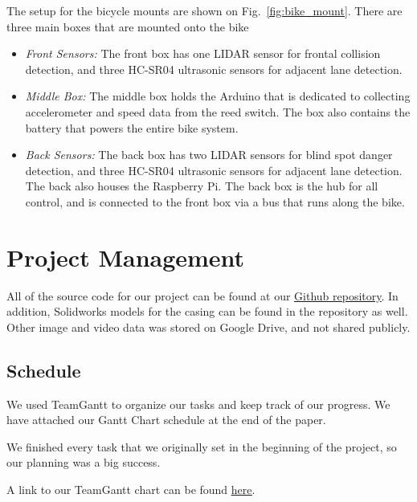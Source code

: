 \documentclass[journal]{IEEEtran}
\begin{document}
The setup for the bicycle mounts are shown on Fig.~\ref{fig:bike_mount}. There are three main boxes that are mounted onto the bike
\begin{itemize}
    \item \textit{Front Sensors:} The front box has one LIDAR sensor for frontal collision detection, and three HC-SR04 ultrasonic sensors for adjacent lane detection.
    \item \textit{Middle Box:} The middle box holds the Arduino that is dedicated to collecting accelerometer and speed data from the reed switch. The box also contains the battery that powers the entire bike system. 
    \item \textit{Back Sensors:} The back box has two LIDAR sensors for blind spot danger detection, and three HC-SR04 ultrasonic sensors for adjacent lane detection. The back also houses the Raspberry Pi. The back box is the hub for all control, and is connected to the front box via a bus that runs along the bike.
\end{itemize}

\section{Project Management}
All of the source code for our project can be found at our \href{https://github.com/mikinty/CycleSafe}{\underline{Github repository}}. In addition, Solidworks models for the casing can be found in the repository as well. Other image and video data was stored on Google Drive, and not shared publicly.

\subsection{Schedule}
We used TeamGantt to organize our tasks and keep track of our progress. We have attached our Gantt Chart schedule at the end of the paper. 

We finished every task that we originally set in the beginning of the project, so our planning was a big success. 

A link to our TeamGantt chart can be found \href{https://prod.teamgantt.com/gantt/schedule/?ids=1489092&public_keys=7aQHatcI23su&zoom=d100&font_size=12&estimated_hours=0&assigned_resources=0&percent_complete=0&documents=0&comments=0&col_width=355&hide_header_tabs=0&menu_view=1&resource_filter=1&name_in_bar=0&name_next_to_bar=0&resource_names=1#user=&company=&custom=&date_filter=&hide_completed=false&color_filter=}{\underline{here}}.
\end{document}
